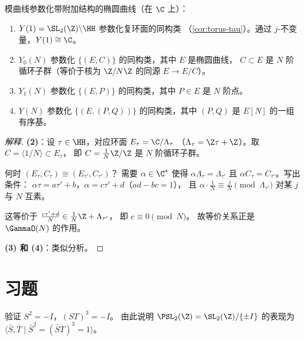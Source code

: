\begin{theorem}[模诠释]
\label{thm:moduli-interpretation}
模曲线参数化带附加结构的椭圆曲线（在 $\C$ 上）：
\begin{enumerate}
  \item $Y(1) = \SL_2(\Z) \backslash \HH$ 参数化复环面的同构类
    （\cref{cor:torus-tau}）。通过 $j$-不变量，$Y(1) \cong \C$。
  \item $Y_0(N)$ 参数化 $\{(E, C)\}$ 的同构类，其中 $E$ 是椭圆曲线，
    $C \subset E$ 是 $N$ 阶循环子群（等价于核为 $\Z/N\Z$ 的同源
    $E \to E/C$）。
  \item $Y_1(N)$ 参数化 $\{(E, P)\}$ 的同构类，其中 $P \in E$ 是
    $N$ 阶点。
  \item $Y(N)$ 参数化 $\{(E, (P, Q))\}$ 的同构类，其中 $(P, Q)$ 是
    $E[N]$ 的一组有序基。
\end{enumerate}
\end{theorem}

\begin{proof}[解释]
\textbf{(2)}：设 $\tau \in \HH$，对应环面 $E_\tau = \C/\Lambda_\tau$
（$\Lambda_\tau = \Z\tau + \Z$）。取 $C = \langle 1/N \rangle \subset E_\tau$，
即 $C = \frac{1}{N}\Z/\Z$ 是 $N$ 阶循环子群。

何时 $(E_\tau, C_\tau) \cong (E_{\tau'}, C_{\tau'})$？
需要 $\alpha \in \C^*$ 使得 $\alpha\Lambda_\tau = \Lambda_{\tau'}$
且 $\alpha C_\tau = C_{\tau'}$。写出条件：
$\alpha\tau = a\tau' + b$，$\alpha = c\tau' + d$（$ad - bc = 1$），
且 $\alpha \cdot \frac{1}{N} \equiv \frac{j}{N} \pmod{\Lambda_{\tau'}}$
对某 $j$ 与 $N$ 互素。

这等价于 $\frac{c\tau' + d}{N} \in \frac{1}{N}\Z + \Lambda_{\tau'}$，
即 $c \equiv 0 \pmod{N}$。
故等价关系正是 $\GammaO(N)$ 的作用。

\textbf{(3) 和 (4)}：类似分析。
\end{proof}


\section{习题}
\label{sec:ch1-exercises}

\begin{exercise}
\label{ex:ch1-sl2z-1}
验证 $S^2 = -I$，$(ST)^3 = -I$。
由此说明 $\PSL_2(\Z) = \SL_2(\Z)/\{\pm I\}$ 的表现为
$\langle \bar{S}, \bar{T} \mid \bar{S}^2 = (\bar{S}\bar{T})^3 = 1 \rangle$。
\end{exercise}

